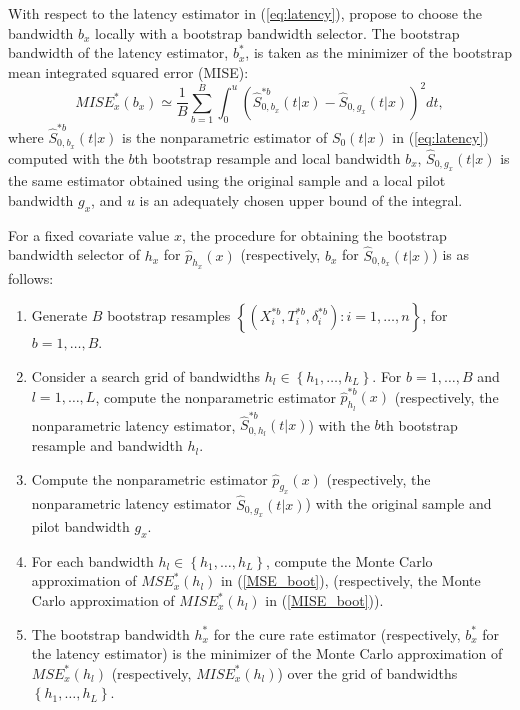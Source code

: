 With respect to the latency estimator in (\ref{eq:latency}), \cite{Lopez2} propose to choose the bandwidth $b_x$ locally with a bootstrap bandwidth selector. The bootstrap bandwidth of the latency estimator, $b_x^*$, is taken as the minimizer of the bootstrap mean integrated squared error (MISE):
\begin{equation}
MISE_{x}^*(b_x) \simeq \frac{1}{B}\sum_{b=1}^B\int_0^u\left(\hat S_{0,b_x}^{*b}\left(t|x \right) - \hat S_{0,g_x}\left(t|x\right)\right)^2dt,
\label{MISE_boot}
\end{equation}
where $\hat S_{0,b_x}^{*b}\left(t|x \right)$ is the nonparametric estimator of $S_0 \left (t|x \right)$ in (\ref{eq:latency}) computed with the $b$th bootstrap resample and local bandwidth $b_x$, $\hat S_{0,g_x}\left (t|x \right)$ is the same estimator obtained using the original sample and a local pilot bandwidth $g_x$, and $u$ is an adequately chosen upper bound of the integral.

For a fixed covariate value $x$, the procedure for obtaining the bootstrap bandwidth selector of $h_x$ for $\hat{p}_{h_x}(x)$ (respectively, $b_x$ for $\hat S_{0,b_x}\left (t|x \right)$) is as follows:
\begin{enumerate}
\item Generate $B$ bootstrap resamples $\left \{\left (X_i^{\ast b},T_i^{\ast b},\delta_i^{\ast b}\right ): i=1,\ldots,n \right \}$, for $b=1,\ldots,B$.
\item Consider a search grid of bandwidths $h_l \in \left \{h_1,\ldots,h_L\right \}$. For $b=1,\ldots,B$ and $l=1,\ldots,L$, compute the nonparametric estimator $\hat p_{h_l}^{*b}(x)$ (respectively, the nonparametric latency estimator, $\hat S_{0,h_l}^{*b}\left(t|x \right)$) with the $b$th bootstrap resample and bandwidth $h_l$.
\item Compute the nonparametric estimator $\hat p_{g_x}(x)$ (respectively, the nonparametric latency estimator $\hat S_{0,g_x}\left(t|x \right)$) with the original sample and pilot bandwidth $g_x$.
\item For each bandwidth $h_l\in \left \{h_1,\ldots,h_L \right \}$, compute the Monte Carlo approximation of $MSE_{x}^*(h_l)$ in (\ref{MSE_boot}), (respectively, the Monte Carlo approximation of $MISE_{x}^*(h_l)$ in (\ref{MISE_boot})).
\item The bootstrap bandwidth $h_x^*$ for the cure rate estimator (respectively, $b_x^*$ for the latency estimator) is the minimizer of the Monte Carlo approximation of $MSE_{x}^*(h_l)$ (respectively, $MISE_{x}^*(h_l)$) over the grid of bandwidths $\left \{h_1,\ldots,h_L\right \}$.
\end{enumerate}

